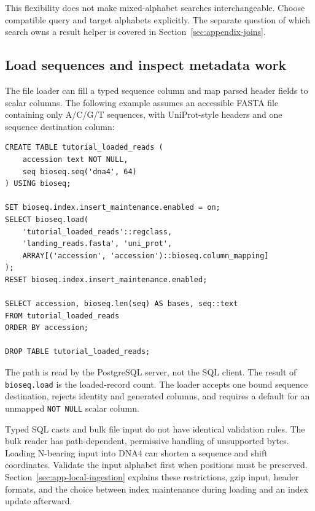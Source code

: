 This flexibility does not make mixed-alphabet searches interchangeable.
Choose compatible query and target alphabets explicitly. The separate
question of which search owns a result helper is covered in
Section~\ref{sec:appendix-joins}.

\subsection{Load sequences and inspect metadata work}

The file loader can fill a typed sequence column and map parsed header
fields to scalar columns. The following example assumes an accessible
FASTA file containing only A/C/G/T sequences, with UniProt-style headers
and one sequence destination column:

\par\noindent\begin{minipage}{\linewidth}
\begin{lstlisting}[style=bioseq-appendix-sql]
CREATE TABLE tutorial_loaded_reads (
    accession text NOT NULL,
    seq bioseq.seq('dna4', 64)
) USING bioseq;

SET bioseq.index.insert_maintenance.enabled = on;
SELECT bioseq.load(
    'tutorial_loaded_reads'::regclass,
    'landing_reads.fasta', 'uni_prot',
    ARRAY[('accession', 'accession')::bioseq.column_mapping]
);
RESET bioseq.index.insert_maintenance.enabled;

SELECT accession, bioseq.len(seq) AS bases, seq::text
FROM tutorial_loaded_reads
ORDER BY accession;

DROP TABLE tutorial_loaded_reads;
\end{lstlisting}
\end{minipage}

The path is read by the PostgreSQL server, not the SQL client. The result of
\texttt{bioseq.load} is the loaded-record count. The loader accepts one
bound sequence destination, rejects identity and generated columns, and
requires a default for an unmapped \texttt{NOT NULL} scalar column.

Typed SQL casts and bulk file input do not have identical validation rules.
The bulk reader has path-dependent, permissive handling of unsupported
bytes. Loading N-bearing input into DNA4 can shorten a sequence and shift
coordinates. Validate the input alphabet first when positions must be
preserved. Section~\ref{sec:app-local-ingestion} explains these restrictions,
gzip input, header formats, and the choice between index maintenance during
loading and an index update afterward.

